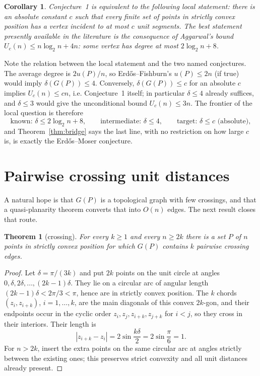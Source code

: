 \documentclass[11pt]{article}
\newtheorem{theorem}{Theorem}
\newtheorem{corollary}{Corollary}
\theoremstyle{definition}
\theoremstyle{remark}
\newcommand{\UC}{U_c}
\begin{document}
\begin{corollary}
Conjecture~1 is equivalent to the following local statement: \emph{there is an
absolute constant $c$ such that every finite set of points in strictly convex position
has a vertex incident to at most $c$ unit segments.}  The best statement presently
available in the literature is the consequence of Aggarwal's bound
$\UC(n)\le n\log_2 n+4n$: some vertex has degree at most $2\log_2 n+8$.
\end{corollary}

Note the relation between the local statement and the two named conjectures.  The
average degree is $2u(P)/n$, so Erd\H{o}s--Fishburn's $u(P)\le2n$ (if true) would imply
$\delta(G(P))\le4$.  Conversely, $\delta(G(P))\le c$ for an absolute $c$ implies
$\UC(n)\le cn$, i.e. Conjecture~1 itself; in particular $\delta\le4$ already suffices,
and $\delta\le3$ would give the unconditional bound $\UC(n)\le3n$.  The frontier of
the local question is therefore
\[
\text{known: } \delta\le 2\log_2 n+8,\qquad
\text{intermediate: } \delta\le 4,\qquad
\text{target: } \delta\le c\text{ (absolute)},
\]
and Theorem~\ref{thm:bridge} says the last line, with no restriction on how large $c$
is, is exactly the Erd\H{o}s--Moser conjecture.

\section{Pairwise crossing unit distances}

A natural hope is that $G(P)$ is a topological graph with few crossings, and that a
quasi-planarity theorem converts that into $O(n)$ edges.  The next result closes that
route.

\begin{theorem}[crossing]\label{thm:crossing}
For every $k\ge1$ and every $n\ge2k$ there is a set $P$ of $n$ points in strictly
convex position for which $G(P)$ contains $k$ pairwise crossing edges.
\end{theorem}

\begin{proof}
Let $\delta=\pi/(3k)$ and put $2k$ points on the unit circle at angles
$0,\delta,2\delta,\dots,(2k-1)\delta$.  They lie on a circular arc of angular length
$(2k-1)\delta<2\pi/3<\pi$, hence are in strictly convex position.  The $k$ chords
$(z_i,z_{i+k})$, $i=1,\dots,k$, are the main diagonals of this convex $2k$-gon, and
their endpoints occur in the cyclic order $z_i,z_j,z_{i+k},z_{j+k}$ for $i<j$, so they
cross in their interiors.  Their length is
\[
|z_{i+k}-z_i|=2\sin\frac{k\delta}{2}=2\sin\frac{\pi}{6}=1 .
\]
For $n>2k$, insert the extra points on the same circular arc at angles strictly between
the existing ones; this preserves strict convexity and all unit distances already
present.
\end{proof}
\end{document}
